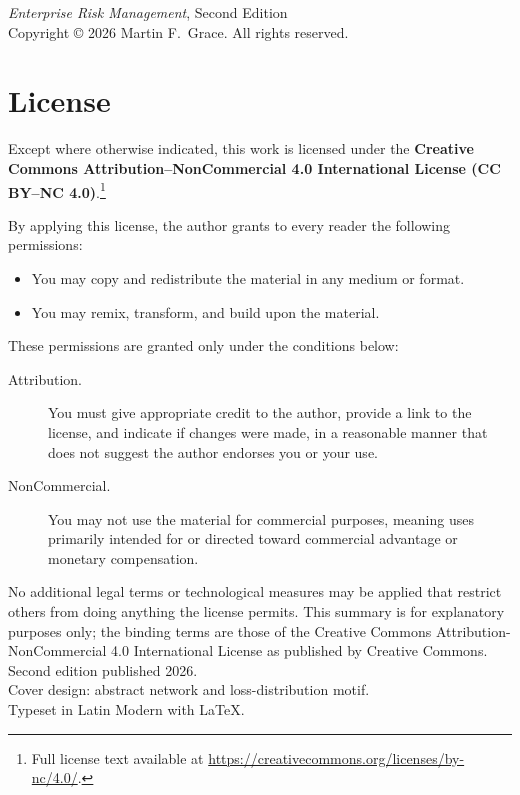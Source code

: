 \documentclass[11pt,openany]{book}
\begin{document}
\thispagestyle{empty}
\null\vfill
\begin{flushleft}\small
\textit{Enterprise Risk Management}, Second Edition\\[4pt]
Copyright \copyright{} 2026 Martin F.\ Grace. All rights reserved.\\[10pt]

\section*{License}

Except where otherwise indicated, this work is licensed under the
\textbf{Creative Commons Attribution--NonCommercial
4.0 International License (CC BY--NC 4.0)}.\footnote{Full
license text available at
\url{https://creativecommons.org/licenses/by-nc/4.0/}.}

By applying this license, the author grants to every reader the
following permissions:

\begin{itemize}
  \item You may copy and redistribute the material in any medium or format.
  \item You may remix, transform, and build upon the material.
\end{itemize}

These permissions are granted only under the conditions below:

\begin{description}
  \item[Attribution.] You must give appropriate credit to the
  author, provide a link to the license, and indicate if changes
  were made, in a reasonable manner that does not suggest the
  author endorses you or your use.

  \item[NonCommercial.] You may not use the material for
  commercial purposes, meaning uses primarily intended for or
  directed toward commercial advantage or monetary compensation.
\end{description}

No additional legal terms or technological measures may be
applied that restrict others from doing anything the license
permits. This summary is for explanatory purposes only; the
binding terms are those of the Creative Commons
Attribution-NonCommercial 4.0 International
License as published by Creative Commons. \\[10pt]
Second edition published 2026.\\[10pt]
Cover design: abstract network and loss-distribution motif.\\
Typeset in Latin Modern with \LaTeX.
\end{flushleft}
\vspace*{0.4in}
\clearpage
\end{document}
